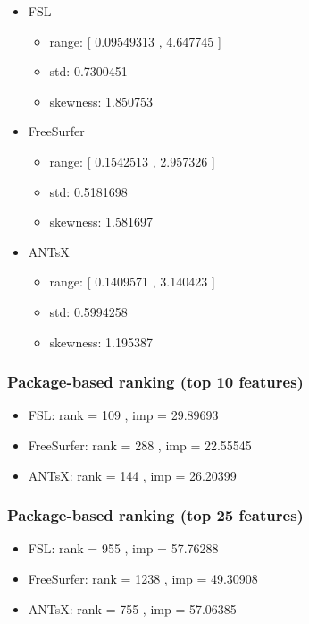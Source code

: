 \documentclass[
  10pt,
]{article}
\begin{document}
\begin{itemize}
\item
  FSL

  \begin{itemize}
  \item
    range: {[} 0.09549313 , 4.647745 {]}
  \item
    std: 0.7300451
  \item
    skewness: 1.850753
  \end{itemize}
\item
  FreeSurfer

  \begin{itemize}
  \item
    range: {[} 0.1542513 , 2.957326 {]}
  \item
    std: 0.5181698
  \item
    skewness: 1.581697
  \end{itemize}
\item
  ANTsX

  \begin{itemize}
  \item
    range: {[} 0.1409571 , 3.140423 {]}
  \item
    std: 0.5994258
  \item
    skewness: 1.195387
  \end{itemize}
\end{itemize}

\hypertarget{package-based-ranking-top-10-features-3}{%
\subsubsection{Package-based ranking (top 10
features)}\label{package-based-ranking-top-10-features-3}}

\begin{itemize}
\item
  FSL: rank = 109 , imp = 29.89693
\item
  FreeSurfer: rank = 288 , imp = 22.55545
\item
  ANTsX: rank = 144 , imp = 26.20399
\end{itemize}

\hypertarget{package-based-ranking-top-25-features-3}{%
\subsubsection{Package-based ranking (top 25
features)}\label{package-based-ranking-top-25-features-3}}

\begin{itemize}
\item
  FSL: rank = 955 , imp = 57.76288
\item
  FreeSurfer: rank = 1238 , imp = 49.30908
\item
  ANTsX: rank = 755 , imp = 57.06385
\end{itemize}
\end{document}

